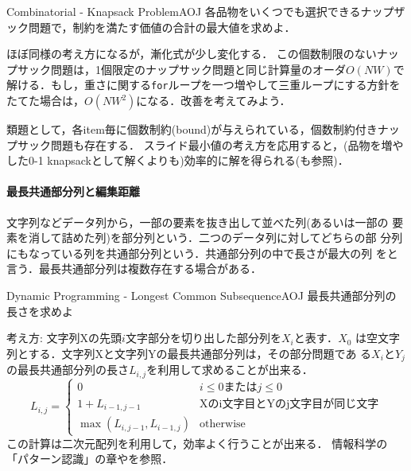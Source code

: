\begin{pbox}{Combinatorial - Knapsack Problem}{AOJ}
各品物をいくつでも選択できるナップザック問題で，制約を満たす価値の合計の最大値を求めよ．

\end{pbox}

ほぼ同様の考え方になるが，漸化式が少し変化する．
この個数制限のないナップサック問題は，1個限定のナップサック問題と同じ計算量のオーダ$O(NW)$で解ける．もし，重さに関する\texttt{for}ループを一つ増やして三重ループにする方針をたてた場合は，$O(NW^2)$になる．改善を考えてみよう．

類題として，各item毎に個数制約(bound)が与えられている，個数制約付きナップサック問題も存在する．
スライド最小値の考え方を応用すると，(品物を増やした0-1 knapsackとして解くよりも)効率的に解を得られる(\pccbook[p.~302]も参照)．

\paragraph{最長共通部分列と編集距離}
文字列などデータ列から，一部の要素を抜き出して並べた列(あるいは一部の
要素を消して詰めた列)を部分列という．二つのデータ列に対してどちらの部
分列にもなっている列を共通部分列という．共通部分列の中で長さが最大の列
をと言う．最長共通部分列は複数存在する場合がある．

\begin{pbox}{Dynamic Programming - Longest Common Subsequence}{AOJ}
最長共通部分列の長さを求めよ

\end{pbox}

考え方: 文字列Xの先頭$i$文字部分を切り出した部分列を$X_i$と表す．$X_0$
は空文字列とする．文字列Xと文字列Yの最長共通部分列は，その部分問題であ
る$X_i$と$Y_j$の最長共通部分列の長さ$L_{i,j}$を利用して求めることが出来る．
\begin{equation*}
    L_{i,j} = \left\{
  \begin{array}{ll}
    0 & i \le 0 \mbox{または} j \le 0\\
    1 + L_{i-1,j-1} & \mbox{Xのi文字目とYのj文字目が同じ文字}\\
    \max(L_{i,j-1},L_{i-1,j}) & \mbox{otherwise}
  \end{array}\right.
\end{equation*}
この計算は二次元配列を利用して，効率よく行うことが出来る．
情報科学の「パターン認識」の章や\pcaojbook[pp.~253--]を参照．

